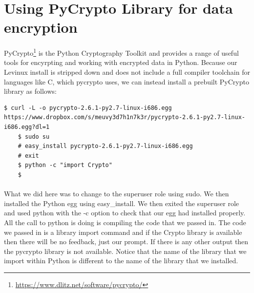 \documentclass[12pt, a4paper, twoside]{book}
\begin{document}
\section{Using PyCrypto Library for data encryption}
\label{pycrypto}
\paragraph{} PyCrypto\footnote{\url{https://www.dlitz.net/software/pycrypto/}} is the Python Cryptography Toolkit and provides a range of useful tools for encyrpting and working with encrypted data in Python. Because our Levinux install is stripped down and does not include a full compiler toolchain for languages like C, which pycrypto uses, we can instead install a prebuilt PyCrypto library as follows:

\begin{lstlisting}[style=DOS]
    $ curl -L -o pycrypto-2.6.1-py2.7-linux-i686.egg https://www.dropbox.com/s/meuvy3d7h1n7k3r/pycrypto-2.6.1-py2.7-linux-i686.egg?dl=1
    $ sudo su
    # easy_install pycrypto-2.6.1-py2.7-linux-i686.egg
    # exit
    $ python -c "import Crypto"
    $
\end{lstlisting}

\paragraph{} What we did here was to change to the superuser role using sudo. We then installed the Python egg using easy\_install. We then exited the superuser role and used python with the -c option to check that our egg had installed properly. All the call to python is doing is compiling the code that we passed in. The code we passed in is a library import command and if the Crypto library is available then there will be no feedback, just our prompt. If there is any other output then the pycrypto library is not available. Notice that the name of the library that we import within Python is different to the name of the library that we installed.
\end{document}
